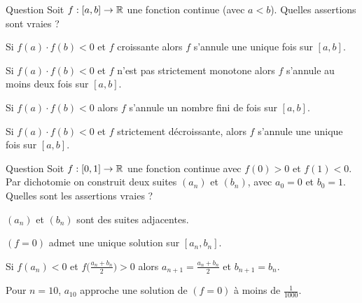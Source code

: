 \begin{multi}[multiple,feedback=
{Le théorème des valeurs intermédiaires implique que si \(f : [a,b] \to \Rr\) est continue avec \(f(a) \cdot f(b) < 0\) alors
il existe une valeur \(c \in [a,b]\) telle que \(f(c)=0\). Pour avoir l'unicité de ce zéro, il suffit que \(f\) soit strictement croissante ou bien strictement décroissante.
}]{Question}
Soit \(f : [a,b] \to \Rr\) une fonction continue (avec \(a < b\)). Quelles assertions sont vraies ?

    \item Si \(f(a) \cdot f(b) < 0\) et \(f\) croissante alors \(f\) s'annule une unique fois sur \([a,b]\).
    \item Si \(f(a) \cdot f(b) < 0\) et \(f\) n'est pas strictement monotone alors \(f\) s'annule au moins deux fois sur \([a,b]\).
    \item Si \(f(a) \cdot f(b) < 0\) alors \(f\) s'annule un nombre fini de fois sur \([a,b]\).
    \item* Si \(f(a) \cdot f(b) < 0\) et \(f\) strictement décroissante, alors \(f\) s'annule une unique fois sur \([a,b]\).
\end{multi}


\begin{multi}[multiple,feedback=
{Par dichotomie les suites construites vérifient : \((a_n)\) est croissante, \((b_n)\) est décroissante et \(a_n \le b_n\), et \(b_n-a_n \to 0\). Ce sont donc des suites adjacentes. En plus la limite de ces deux suites est une solution de l'équation \((f=0)\).
Le méthode implique ici que si \(f(a_n)>0\), \(f(b_n)<0\) et \(f\big(\frac{a_n+b_n}{2}\big) >0\) alors \(a_{n+1} =\frac{a_n+b_n}{2}\) et \(b_{n+1}=b_n\).
L'intervalle \([a_n,b_n]\) où se trouve un zéro est divisé par deux à chaque étape. Donc au bout de \(10\) étapes l'intervalle
\([a_{10},b_{10}]\) est un sous intervalle de l'intervalle de départ \([0,1]\), et sa longueur est \(\frac{1}{2^{10}} = \frac{1}{1024} < \frac1{1000}\).
}]{Question}
Soit \(f : [0,1] \to \mathbb{R}\) une fonction continue avec \(f(0)>0\) et \(f(1)<0\).
Par dichotomie on construit deux suites \((a_n)\) et \((b_n)\), avec \(a_0 = 0\) et \(b_0 = 1\). Quelles sont les assertions vraies ?

    \item* \((a_n)\) et \((b_n)\) sont des suites adjacentes.
    \item \((f=0)\) admet une unique solution sur \([a_n,b_n]\).
    \item* Si \(f(a_n)<0\) et \(f\big(\frac{a_n+b_n}{2}\big) >0\) alors \(a_{n+1} =\frac{a_n+b_n}{2}\) et \(b_{n+1}=b_n\).
    \item* Pour \(n=10\), \(a_{10}\) approche une solution de \((f=0)\) à moins de \(\frac{1}{1000}\).
\end{multi}



